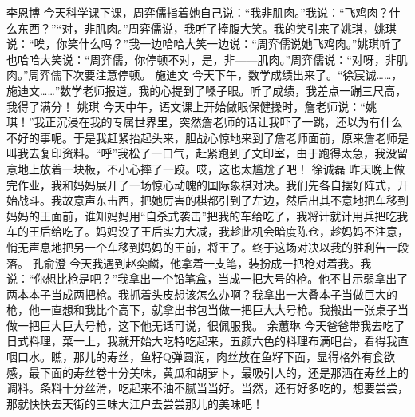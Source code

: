 {}\markdownRendererInterblockSeparator
{}李恩博\markdownRendererInterblockSeparator
{}今天科学课下课，周弈儒指着她自己说：“我非肌肉。”我说：“飞鸡肉？什么东西？”“对，非肌肉。”周弈儒说，我听了捧腹大笑。我的笑引来了姚琪，姚琪说：“唉，你笑什么吗？”我一边哈哈大笑一边说：“周弈儒说她飞鸡肉。”姚琪听了也哈哈大笑说：“周弈儒，你停顿不对，是，非——肌肉。”周弈儒说：“对呀，非肌肉。”周弈儒下次要注意停顿。\markdownRendererInterblockSeparator
{}\markdownRendererInterblockSeparator
{}施迪文\markdownRendererInterblockSeparator
{}今天下午，数学成绩出来了。“徐宸诚……，施迪文……”数学老师报道。我的心提到了嗓子眼。听了成绩，我差点一蹦三尺高，我得了满分！\markdownRendererInterblockSeparator
{}\markdownRendererInterblockSeparator
{}姚琪\markdownRendererInterblockSeparator
{}今天中午，语文课上开始做眼保健操时，詹老师说：“姚琪！”我正沉浸在我的专属世界里，突然詹老师的话让我吓了一跳，还以为有什么不好的事呢。于是我赶紧抬起头来，胆战心惊地来到了詹老师面前，原来詹老师是叫我去复印资料。“呼”我松了一口气，赶紧跑到了文印室，由于跑得太急，我没留意地上放着一块板，不小心摔了一跤。哎，这也太尴尬了吧！\markdownRendererInterblockSeparator
{}\markdownRendererInterblockSeparator
{}徐诚磊\markdownRendererInterblockSeparator
{}昨天晚上做完作业，我和妈妈展开了一场惊心动魄的国际象棋对决。我们先各自摆好阵式，开始战斗。我故意声东击西，把她厉害的棋都引到了左边，然后出其不意地把车移到妈妈的王面前，谁知妈妈用“自杀式袭击”把我的车给吃了，我将计就计用兵把吃我车的王后给吃了。妈妈没了王后实力大减，我趁此机会暗度陈仓，趁妈妈不注意，悄无声息地把另一个车移到妈妈的王前，将王了。终于这场对决以我的胜利告一段落。\markdownRendererInterblockSeparator
{}\markdownRendererInterblockSeparator
{}孔俞澄\markdownRendererInterblockSeparator
{}今天我遇到赵奕麟，他拿着一支笔，装扮成一把枪对着我。我说：“你想比枪是吧？”我拿出一个铅笔盒，当成一把大号的枪。他不甘示弱拿出了两本本子当成两把枪。我抓着头皮想该怎么办啊？我拿出一大叠本子当做巨大的枪，他一直想和我比个高下，就拿出书包当做一把巨大大号枪。我搬出一张桌子当做一把巨大巨大号枪，这下他无话可说，很佩服我。\markdownRendererInterblockSeparator
{}\markdownRendererInterblockSeparator
{}余蕙琳\markdownRendererInterblockSeparator
{}今天爸爸带我去吃了日式料理，菜一上，我就开始大吃特吃起来，五颜六色的料理布满吧台，看得我直咽口水。瞧，那儿的寿丝，鱼籽Q弹圆润，肉丝放在鱼籽下面，显得格外有食欲感，最下面的寿丝卷十分美味，黄瓜和胡萝卜，最吸引人的，还是那洒在寿丝上的调料。条料十分丝滑，吃起来不油不腻当当好。当然，还有好多吃的，想要尝尝，那就快快去天街的三味大江户去尝尝那儿的美味吧！\markdownRendererInterblockSeparator
